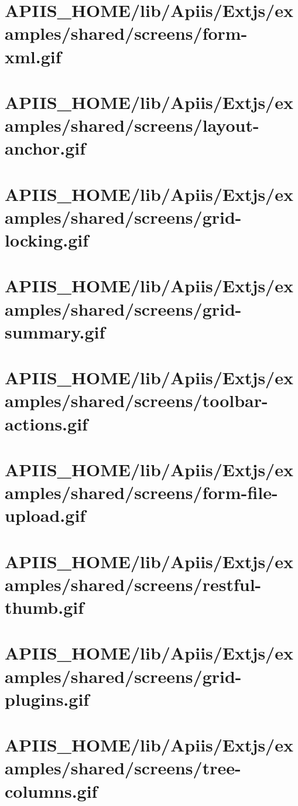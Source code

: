 \section{APIIS\_HOME/lib/Apiis/Extjs/examples/shared/screens/form-xml.gif} 
\section{APIIS\_HOME/lib/Apiis/Extjs/examples/shared/screens/layout-anchor.gif} 
\section{APIIS\_HOME/lib/Apiis/Extjs/examples/shared/screens/grid-locking.gif} 
\section{APIIS\_HOME/lib/Apiis/Extjs/examples/shared/screens/grid-summary.gif} 
\section{APIIS\_HOME/lib/Apiis/Extjs/examples/shared/screens/toolbar-actions.gif} 
\section{APIIS\_HOME/lib/Apiis/Extjs/examples/shared/screens/form-file-upload.gif} 
\section{APIIS\_HOME/lib/Apiis/Extjs/examples/shared/screens/restful-thumb.gif} 
\section{APIIS\_HOME/lib/Apiis/Extjs/examples/shared/screens/grid-plugins.gif} 
\section{APIIS\_HOME/lib/Apiis/Extjs/examples/shared/screens/tree-columns.gif} 
